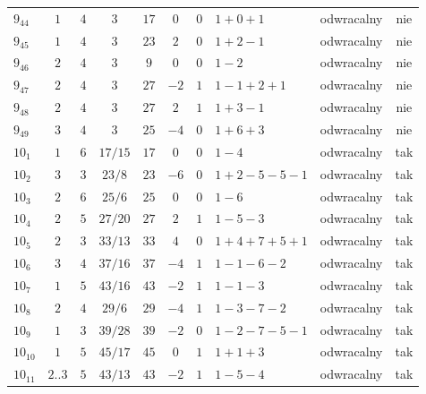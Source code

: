 \begin{longtable}{lccccccllc}
$9_{44}$    &  $1$     &  $4$  &  $3$      &  $17$   &  $0$   &  $0$  &  $1+0+1$        &  odwracalny  &  nie  \\
$9_{45}$    &  $1$     &  $4$  &  $3$      &  $23$   &  $2$   &  $0$  &  $1+2-1$        &  odwracalny  &  nie  \\
$9_{46}$    &  $2$     &  $4$  &  $3$      &  $9$    &  $0$   &  $0$  &  $1-2$          &  odwracalny  &  nie  \\
$9_{47}$    &  $2$     &  $4$  &  $3$      &  $27$   &  $-2$  &  $1$  &  $1-1+2+1$      &  odwracalny  &  nie  \\
$9_{48}$    &  $2$     &  $4$  &  $3$      &  $27$   &  $2$   &  $1$  &  $1+3-1$        &  odwracalny  &  nie  \\
$9_{49}$    &  $3$     &  $4$  &  $3$      &  $25$   &  $-4$  &  $0$  &  $1+6+3$        &  odwracalny  &  nie  \\
$10_{1}$    &  $1$     &  $6$  &  $17/15$  &  $17$   &  $0$   &  $0$  &  $1-4$          &  odwracalny  &  tak  \\
$10_{2}$    &  $3$     &  $3$  &  $23/8$   &  $23$   &  $-6$  &  $0$  &  $1+2-5-5-1$    &  odwracalny  &  tak  \\
$10_{3}$    &  $2$     &  $6$  &  $25/6$   &  $25$   &  $0$   &  $0$  &  $1-6$          &  odwracalny  &  tak  \\
$10_{4}$    &  $2$     &  $5$  &  $27/20$  &  $27$   &  $2$   &  $1$  &  $1-5-3$        &  odwracalny  &  tak  \\
$10_{5}$    &  $2$     &  $3$  &  $33/13$  &  $33$   &  $4$   &  $0$  &  $1+4+7+5+1$    &  odwracalny  &  tak  \\
$10_{6}$    &  $3$     &  $4$  &  $37/16$  &  $37$   &  $-4$  &  $1$  &  $1-1-6-2$      &  odwracalny  &  tak  \\
$10_{7}$    &  $1$     &  $5$  &  $43/16$  &  $43$   &  $-2$  &  $1$  &  $1-1-3$        &  odwracalny  &  tak  \\
$10_{8}$    &  $2$     &  $4$  &  $29/6$   &  $29$   &  $-4$  &  $1$  &  $1-3-7-2$      &  odwracalny  &  tak  \\
$10_{9}$    &  $1$     &  $3$  &  $39/28$  &  $39$   &  $-2$  &  $0$  &  $1-2-7-5-1$    &  odwracalny  &  tak  \\
$10_{10}$   &  $1$     &  $5$  &  $45/17$  &  $45$   &  $0$   &  $1$  &  $1+1+3$        &  odwracalny  &  tak  \\
$10_{11}$   &  $2..3$  &  $5$  &  $43/13$  &  $43$   &  $-2$  &  $1$  &  $1-5-4$        &  odwracalny  &  tak  \\

\end{longtable}
